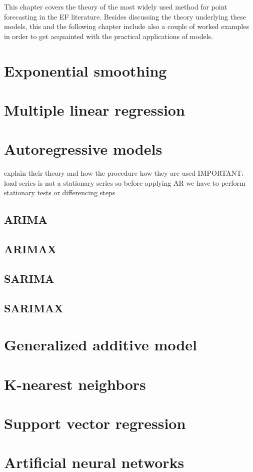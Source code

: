 This chapter covers the theory of the most widely used method for point forecasting in the EF literature. Besides discussing the theory underlying these models, this and the following chapter include also a couple of worked examples in order to get acquainted with the practical applications of models.
\section{Exponential smoothing}

\section{Multiple linear regression}

\section{Autoregressive models}
explain their theory
and how the procedure how they are used
IMPORTANT: load series is not a stationary series so before applying AR we have to perform stationary tests or differencing steps
\subsection{ARIMA}
\subsection{ARIMAX}
\subsection{SARIMA}
\subsection{SARIMAX}

\section{Generalized additive model}
\section{K-nearest neighbors}

\section{Support vector regression}

\section{Artificial neural networks}
